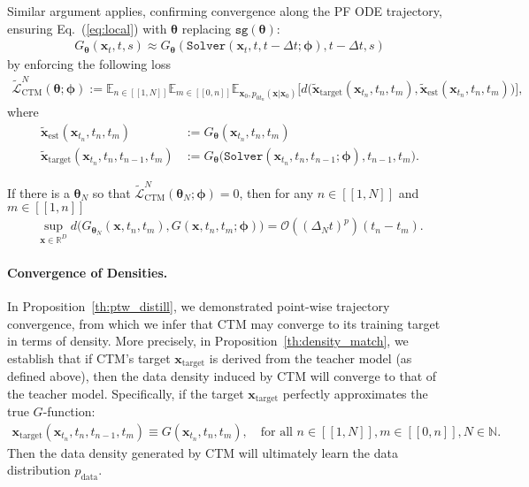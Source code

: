 \documentclass{article} \usepackage{iclr2024_coNFErence,times}
\def\eqref#1{equation~\ref{#1}}
\def\eqref#1{(\ref{#1})}
\def\eqref#1{(\ref{#1})}
\theoremstyle{definition}
\theoremstyle{remark}
\begin{document}
Similar argument applies, confirming convergence along the PF ODE trajectory, ensuring Eq.~\eqref{eq:local} with $\bm{\theta}$ replacing $\texttt{sg}(\bm{\theta})$:
\begin{align*}G_{\bm{\theta}}(\mathbf{x}_{t},t,s)\approx G_{\bm{\theta}}(\texttt{Solver}(\mathbf{x}_{t},t,t-\Delta t;\bm{\phi}),t-\Delta t,s)
\end{align*}
by enforcing the following loss
\begin{align*}
    \tilde{\mathcal{L}}^{N}_{\text{CTM}}(\bm{\theta};\bm{\phi}):=\mathbb{E}_{n\in[\![ 1,N ]\!]}\mathbb{E}_{m\in[\![ 0,n ]\!]}\mathbb{E}_{\mathbf{x}_{0}, p_{0t_{n}}(\mathbf{x}\vert\mathbf{x}_{0})}\Big[d\big(\tilde{\mathbf{x}}_{\text{target}}(\mathbf{x}_{t_n},t_n,t_m),\tilde{\mathbf{x}}_{\text{est}}(\mathbf{x}_{t_n},t_n,t_m)\big)\Big],
\end{align*}
where
\begin{align*}
    \tilde{\mathbf{x}}_{\text{est}}(\mathbf{x}_{t_n},t_n,t_m)&:=G_{\bm{\theta}}(\mathbf{x}_{t_n},t_n,t_m)\nonumber
    \\ \tilde{\mathbf{x}}_{\text{target}}(\mathbf{x}_{t_n},t_n,t_{n-1},t_m)&:=G_{\bm{\theta}}\big(\texttt{Solver}(\mathbf{x}_{t_n}, t_n,t_{n-1};\bm{\phi}),t_{n-1},t_m\big).
\end{align*}




\begin{proposition}\label{th:ptw_traj_distill}  If there is a $\bm{\theta}_N$ so that $\tilde{\mathcal{L}}_{\text{CTM}}^{N}(\bm{\theta}_N;\bm{\phi})=0$, then for any $n\in[\![ 1,N ]\!]$ and $m\in[\![ 1,n ]\!]$  
\begin{align*}
    \sup_{\mathbf{x}\in\mathbb{R}^D} d\big(G_{\bm{\theta}_N}(\mathbf{x}, t_n, t_m),G(\mathbf{x}, t_n, t_m; \bm{\phi})\big) = \mathcal{O}((\Delta_N t)^{p})(t_n - t_m).
\end{align*}

\end{proposition}



\paragraph{Convergence of Densities.} In Proposition~\ref{th:ptw_distill}, we demonstrated point-wise trajectory convergence, from which we infer that CTM may converge to its training target in terms of density. More precisely, in Proposition~\ref{th:density_match}, we establish that if CTM's target $\mathbf{x}_{\text{target}}$ is derived from the teacher model (as defined above), then the data density induced by CTM will converge to that of the teacher model. Specifically, if the target $\mathbf{x}_{\text{target}}$ perfectly approximates the true $G$-function: 
\begin{align}\label{eq:tar_perfect_match}
    \mathbf{x}_{\text{target}}(\mathbf{x}_{t_n},t_n,t_{n-1},t_m)\equiv G(\mathbf{x}_{t_n},t_n,t_m), \quad \text{for all } n\in[\![ 1,N ]\!], m\in[\![ 0,n ]\!], N\in\mathbb{N}.   
\end{align}
Then the data density generated by CTM will ultimately learn the data distribution $p_{\text{data}}$.
\end{document}
